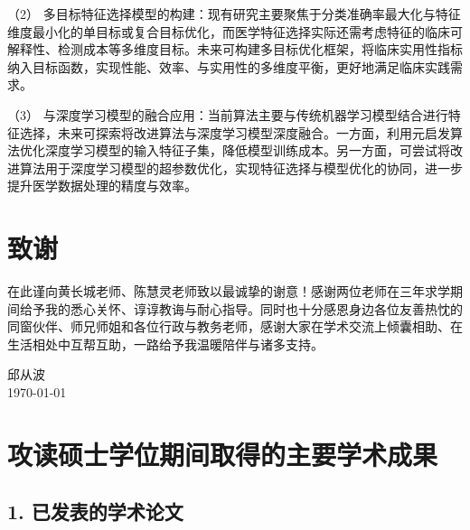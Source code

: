 \documentclass{wzuthesis}
\begin{document}
（2） 多目标特征选择模型的构建：现有研究主要聚焦于分类准确率最大化与特征维度最小化的单目标或复合目标优化，而医学特征选择实际还需考虑特征的临床可解释性、检测成本等多维度目标。未来可构建多目标优化框架，将临床实用性指标纳入目标函数，实现性能、效率、与实用性的多维度平衡，更好地满足临床实践需求。

（3） 与深度学习模型的融合应用：当前算法主要与传统机器学习模型结合进行特征选择，未来可探索将改进算法与深度学习模型深度融合。一方面，利用元启发算法优化深度学习模型的输入特征子集，降低模型训练成本。另一方面，可尝试将改进算法用于深度学习模型的超参数优化，实现特征选择与模型优化的协同，进一步提升医学数据处理的精度与效率。

\newpage

\backmatter
\renewcommand{\chaptermark}[1]{\markboth{\songti #1}{}}
\makereferences
\newpage

\ifdefined\blind  %
\else
    \chapter{致谢}

    在此谨向黄长城老师、陈慧灵老师致以最诚挚的谢意！感谢两位老师在三年求学期间给予我的悉心关怀、谆谆教诲与耐心指导。同时也十分感恩身边各位友善热忱的同窗伙伴、师兄师姐和各位行政与教务老师，感谢大家在学术交流上倾囊相助、在生活相处中互帮互助，一路给予我温暖陪伴与诸多支持。

    \vskip 108pt
    \begin{flushright}
        邱从波\makebox[1cm]{} \\
        \today
    \end{flushright}
    \newpage
\fi
\chapter{攻读硕士学位期间取得的主要学术成果}

\section*{1. 已发表的学术论文}
\end{document}
